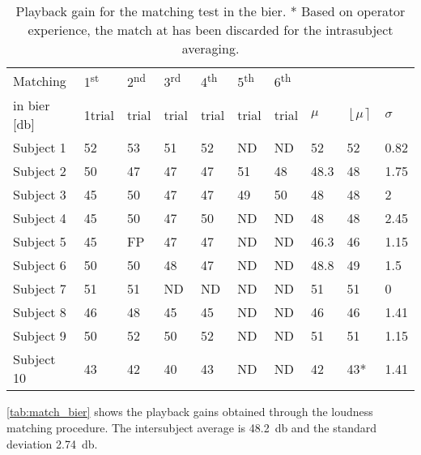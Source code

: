 \begin{table}[H]
\centering
\caption{Playback gain for the matching test in the \gls{bier}. * Based on operator experience, the match at  has been discarded for the intrasubject averaging.}
\begin{tabular}{llllllllll}
\multicolumn{1}{l|}{Matching }   & 1\textsuperscript{st}  & 2\textsuperscript{nd}  & 3\textsuperscript{rd}  & 4\textsuperscript{th} & 5\textsuperscript{th}  & \multicolumn{1}{l|}{6\textsuperscript{th} }                &    & &  \\
\multicolumn{1}{l|}{in \gls{bier} [\si{\decibel}] }   & 1trial & trial &  trial &  trial &  trial & \multicolumn{1}{l|}{trial}                & $\mu$ & $\left \lfloor  \mu \right \rceil$  & $\sigma$ \\ \hline
\multicolumn{1}{l|}{Subject 1}  & 52    & 53    & 51    & 52    & ND    & \multicolumn{1}{l|}{ND} & 52  & 52 & 0.82  \\
\multicolumn{1}{l|}{Subject 2} & 50    & 47    & 47    & 47    & 51    & \multicolumn{1}{l|}{48} & 48.3 & 48 & 1.75 \\
\multicolumn{1}{l|}{Subject 3}  & 45    & 50    & 47    & 47    & 49    & \multicolumn{1}{l|}{50} & 48  & 48 & 2    \\
\multicolumn{1}{l|}{Subject 4}  & 45    & 50    & 47    & 50    & ND    & \multicolumn{1}{l|}{ND} & 48  &48 & 2.45  \\
\multicolumn{1}{l|}{Subject 5}  & 45    & FP    & 47    & 47    & ND    & \multicolumn{1}{l|}{ND} & 46.3 & 46 & 1.15  \\
\multicolumn{1}{l|}{Subject 6}  & 50    & 50    & 48    & 47    & ND    & \multicolumn{1}{l|}{ND} & 48.8 & 49 & 1.5   \\
\multicolumn{1}{l|}{Subject 7}  & 51    & 51    & ND    & ND    & ND    & \multicolumn{1}{l|}{ND} & 51 &  51& 0     \\
\multicolumn{1}{l|}{Subject 8}  & 46    & 48    & 45    & 45    & ND    & \multicolumn{1}{l|}{ND} & 46  & 46 & 1.41  \\
\multicolumn{1}{l|}{Subject 9}  & 50    & 52    & 50    & 52    & ND    & \multicolumn{1}{l|}{ND} & 51 & 51 & 1.15  \\
\multicolumn{1}{l|}{Subject 10}  & 43    & 42    & 40    & 43    & ND    & \multicolumn{1}{l|}{ND} & 42  & 43* & 1.41
\end{tabular}
\label{tab:match_bier} 
\end{table}
\autoref{tab:match_bier} shows the playback gains obtained through the loudness matching procedure. The intersubject average is \SI{48.2}{\decibel} and the standard deviation \SI{2.74}{\decibel}.

